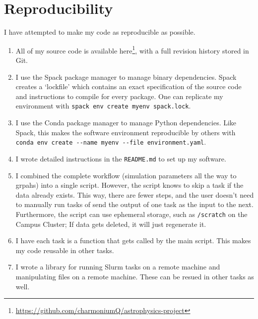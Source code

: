 \section{Reproducibility}

I have attempted to make my code as reproducible as possible.

\begin{enumerate}
\item All of my source code is available here\footnote{\url{https://github.com/charmoniumQ/astrophysics-project}}, with a full revision history stored in Git.
\item I use the Spack package manager \cite{gamblin_spack_2015} to manage binary dependencies. Spack creates a `lockfile' which contains an exact specification of the source code and instructions to compile for every package. One can replicate my environment with \verb+spack env create myenv spack.lock+.
\item I use the Conda package manager to manage Python dependencies. Like Spack, this makes the software environment reproducible by others with \verb+conda env create --name myenv --file environment.yaml+.
\item I wrote detailed instructions in the \verb+README.md+ to set up my software.
\item I combined the complete workflow (simulation parameters all the way to grpahs) into a single script. However, the script knows to skip a task if the data already exists. This way, there are fewer steps, and the user doesn't need to manually run tasks of send the output of one task as the input to the next. Furthermore, the script can use ephemeral storage, such as \verb+/scratch+ on the Campus Cluster; If data gets deleted, it will just regenerate it.
\item I have each task is a function that gets called by the main script. This makes my code reusable in other tasks.
\item I wrote a library for running Slurm tasks on a remote machine and manipulating files on a remote machine. These can be resued in other tasks as well.
\end{enumerate}
